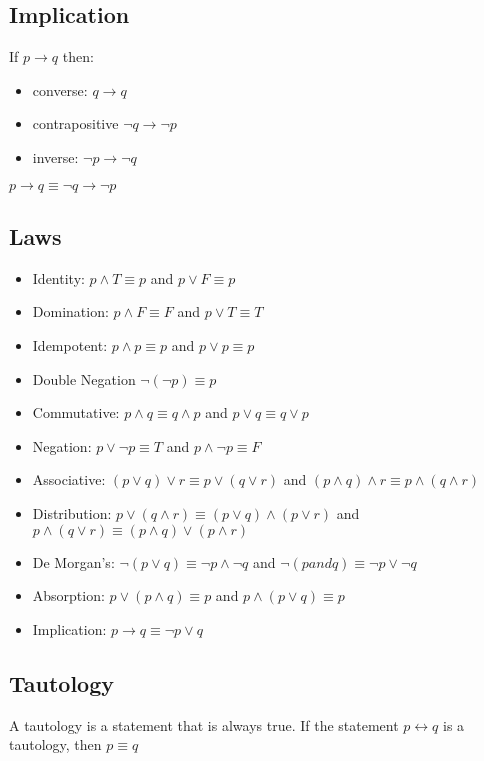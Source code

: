 \documentclass{article}
\theoremstyle{mytheoremstyle}
\theoremstyle{mytheoremstyle}
\theoremstyle{myproblemstyle}
\begin{document}
    \subsection*{Implication}
    If $p \rightarrow q$ then:
    \begin{itemize}
        \item converse: $q \rightarrow q$
        \item contrapositive $\neg q \rightarrow \neg p$
        \item inverse: $\neg p \rightarrow \neg q$
    \end{itemize}
    $p \rightarrow q \equiv \neg q \rightarrow \neg p$

    \subsection*{Laws}
    \begin{itemize}
        \item Identity: $p \wedge T \equiv p$ and $p \vee F \equiv p$
        \item Domination: $p \wedge F \equiv F$ and $p \vee T \equiv T$
        \item Idempotent: $p \wedge p \equiv p$ and $p \vee p \equiv p$
        \item Double Negation $\neg(\neg p) \equiv p$
        \item Commutative: $p \wedge q \equiv q \wedge p$
            and $p \vee q \equiv q \vee p$
        \item Negation: $p \vee \neg p \equiv T$ and $p \wedge \neg p \equiv F$
        \item Associative: $(p \vee q) \vee r \equiv p \vee (q \vee r)$
            and $(p \wedge q) \wedge r \equiv p \wedge (q \wedge r)$
        \item Distribution: $p \vee (q \wedge r) \equiv (p \vee q) \wedge (p \vee r)$
            and $p \wedge (q \vee r) \equiv (p \wedge q) \vee (p \wedge r)$
        \item De Morgan's: $\neg (p \vee q) \equiv \neg p \wedge \neg q$
            and $\neg (p and q) \equiv \neg p \vee \neg q$
        \item Absorption: $p \vee (p \wedge q) \equiv p$
            and $p \wedge (p \vee q) \equiv p$
        \item Implication: $p \rightarrow q \equiv \neg p \vee q$
    \end{itemize}

    \subsection*{Tautology}
    A tautology is a statement that is always true. If the statement
    $p \leftrightarrow q$ is a tautology, then $p \equiv q$
\end{document}

